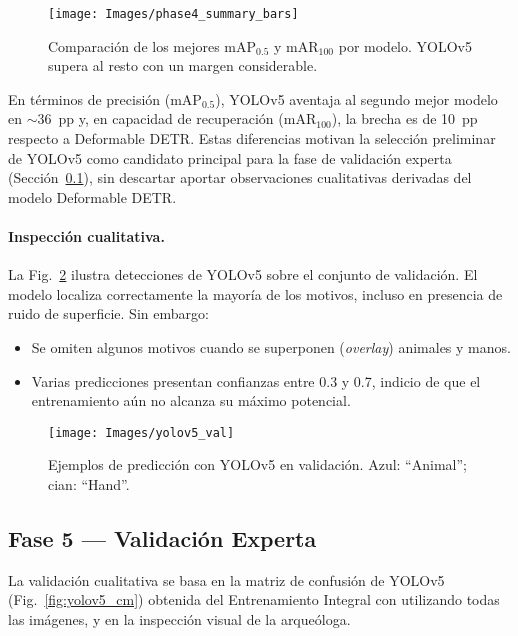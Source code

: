 

\begin{figure}[htpb]
  \centering
  \texttt{[image: Images/phase4\_summary\_bars]}
  \caption{Comparación de los mejores mAP\(_{0.5}\) y mAR\(_{100}\)
           por modelo.  YOLOv5 supera al resto con un margen
           considerable.}
  \label{fig:phase4_bars}
\end{figure}

En términos de precisión (mAP\(_{0.5}\)), YOLOv5 aventaja al segundo mejor modelo en \(\sim\)36~pp y,
en capacidad de recuperación (mAR\(_{100}\)), la brecha es de 10~pp respecto a Deformable DETR.
Estas diferencias motivan la selección preliminar de YOLOv5 como candidato principal para la fase de validación experta
(Sección~\ref{ssec:fase5_experta}), sin descartar aportar observaciones cualitativas derivadas del modelo Deformable DETR.

\paragraph{Inspección cualitativa.}
La Fig.~\ref{fig:yolov5_val} ilustra detecciones de YOLOv5 sobre el conjunto de validación.
El modelo localiza correctamente la mayoría de los motivos, incluso en presencia de ruido de superficie.
Sin embargo:

\begin{itemize}
  \item Se omiten algunos motivos cuando se superponen (\emph{overlay}) animales y manos.
  \item Varias predicciones presentan confianzas entre 0.3 y 0.7, indicio de que el entrenamiento aún no alcanza su máximo potencial.
\end{itemize}

\begin{figure}[htpb]
  \centering
  \texttt{[image: Images/yolov5\_val]}
  \caption{Ejemplos de predicción con YOLOv5 en validación. Azul: “Animal”; cian: “Hand”.}
  \label{fig:yolov5_val}
\end{figure}

\subsection{Fase 5 — Validación Experta}
\label{ssec:fase5_experta}

La validación cualitativa se basa en la matriz de confusión de YOLOv5 (Fig.~\ref{fig:yolov5_cm}) obtenida del Entrenamiento Integral con utilizando todas las imágenes, y en la inspección visual de la arqueóloga.

